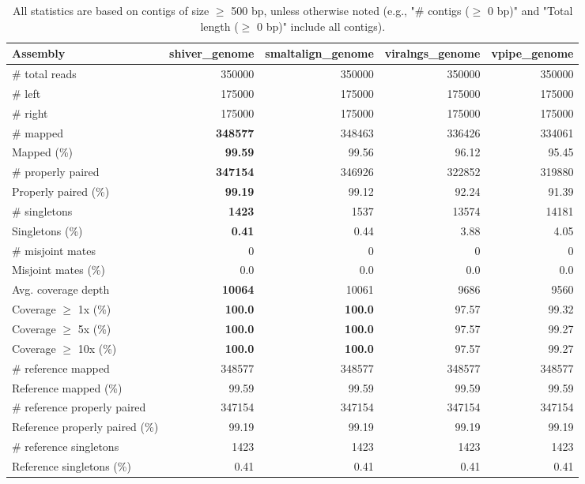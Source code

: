 \documentclass[12pt,a4paper]{article}
\begin{document}
\begin{table}[ht]
\begin{center}
\caption{All statistics are based on contigs of size $\geq$ 500 bp, unless otherwise noted (e.g., "\# contigs ($\geq$ 0 bp)" and "Total length ($\geq$ 0 bp)" include all contigs).}
\begin{tabular}{|l*{4}{|r}|}
\hline
Assembly & shiver\_genome & smaltalign\_genome & viralngs\_genome & vpipe\_genome \\ \hline
\# total reads & 350000 & 350000 & 350000 & 350000 \\ \hline
\# left & 175000 & 175000 & 175000 & 175000 \\ \hline
\# right & 175000 & 175000 & 175000 & 175000 \\ \hline
\# mapped & {\bf 348577} & 348463 & 336426 & 334061 \\ \hline
Mapped (\%) & {\bf 99.59} & 99.56 & 96.12 & 95.45 \\ \hline
\# properly paired & {\bf 347154} & 346926 & 322852 & 319880 \\ \hline
Properly paired (\%) & {\bf 99.19} & 99.12 & 92.24 & 91.39 \\ \hline
\# singletons & {\bf 1423} & 1537 & 13574 & 14181 \\ \hline
Singletons (\%) & {\bf 0.41} & 0.44 & 3.88 & 4.05 \\ \hline
\# misjoint mates & 0 & 0 & 0 & 0 \\ \hline
Misjoint mates (\%) & 0.0 & 0.0 & 0.0 & 0.0 \\ \hline
Avg. coverage depth & {\bf 10064} & 10061 & 9686 & 9560 \\ \hline
Coverage $\geq$ 1x (\%) & {\bf 100.0} & {\bf 100.0} & 97.57 & 99.32 \\ \hline
Coverage $\geq$ 5x (\%) & {\bf 100.0} & {\bf 100.0} & 97.57 & 99.27 \\ \hline
Coverage $\geq$ 10x (\%) & {\bf 100.0} & {\bf 100.0} & 97.57 & 99.27 \\ \hline
\# reference mapped & 348577 & 348577 & 348577 & 348577 \\ \hline
Reference mapped (\%) & 99.59 & 99.59 & 99.59 & 99.59 \\ \hline
\# reference properly paired & 347154 & 347154 & 347154 & 347154 \\ \hline
Reference properly paired (\%) & 99.19 & 99.19 & 99.19 & 99.19 \\ \hline
\# reference singletons & 1423 & 1423 & 1423 & 1423 \\ \hline
Reference singletons (\%) & 0.41 & 0.41 & 0.41 & 0.41 \\ \hline

\end{tabular}
\end{center}
\end{table}
\end{document}
